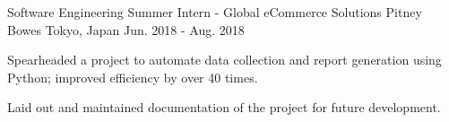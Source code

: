 \begin{cventries}
  \cventry
    {Software Engineering Summer Intern - Global eCommerce Solutions} %
    {Pitney Bowes} %
    {Tokyo, Japan} %
    {Jun. 2018 - Aug. 2018} %
    {
      \begin{cvitems} %
        \item {Spearheaded a project to automate data collection and report generation using Python; improved efficiency by over 40 times.}
        \item {Laid out and maintained documentation of the project for future development.}
      \end{cvitems}
    }

\end{cventries}

